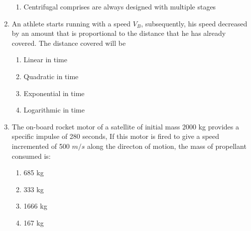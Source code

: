 \documentclass[journal]{IEEEtran}
\begin{document}
\begin{enumerate}[start=35]
\begin{enumerate}
        \item Centrifugal comprises are always designed with multiple stages
    \end{enumerate}
\item  An athlete starts running with a speed  $V_B$, subsequently, his speed decreased by an amount that is proportional to the distance that he has already covered. The distance covered will be
\begin{enumerate}
       \item Linear in time
       \item Quadratic in time
       \item Exponential in time
       \item Logarithmic in time 
   \end{enumerate}
\item The on-board rocket motor of a satellite of initial mass 2000 kg provides a specific impulse of 280 seconds, If this motor is fired to give a speed incremented of 500 $m/s$ along the directon of motion, the mass of propellant consumed is$:$
\begin{multicols}{4}
    \begin{enumerate}
        \item 685 kg
        \item 333 kg
        \item 1666 kg
        \item 167 kg
    \end{enumerate}
\end{multicols}
\end{enumerate}
\end{document}
